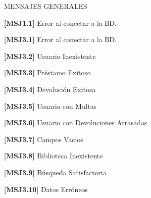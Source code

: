MENSAJES GENERALES
	\begin{Citemize}
	\item {\bf [MSJ1.1]} Error al conectar a la BD.
	\end{Citemize}

	\begin{Citemize}
	\item {\bf [MSJ3.1]} Error al conectar a la BD.
	\end{Citemize}

	\begin{Citemize}
	\item {\bf [MSJ3.2]} Usuario Inexistente
	\end{Citemize}
	
	\begin{Citemize}
	\item {\bf [MSJ3.3]} Préstamo Exitoso
	\end{Citemize}
	
	\begin{Citemize}
	\item {\bf [MSJ3.4]} Devolución Exitosa
	\end{Citemize}
	
	\begin{Citemize}
	\item {\bf [MSJ3.5]} Usuario con Multas
	\end{Citemize}
	
	\begin{Citemize}
	\item {\bf [MSJ3.6]} Usuario con Devoluciones Atrasadas
	\end{Citemize}
	
	\begin{Citemize}
	\item {\bf [MSJ3.7]} Campos Vacios
	\end{Citemize}
	
	\begin{Citemize}
	\item {\bf [MSJ3.8]} Biblioteca Inexistente
	\end{Citemize}
	
	\begin{Citemize}
	\item {\bf [MSJ3.9]} Búsqueda Satisfactoria
	\end{Citemize}
	
	\begin{Citemize}
	\item {\bf [MSJ3.10]} Datos Erróneos
	\end{Citemize}
	

